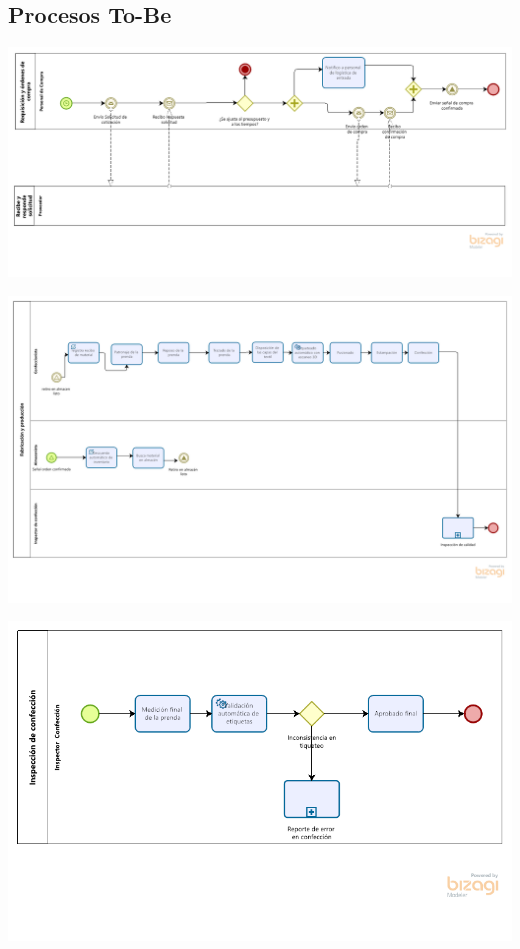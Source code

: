 \documentclass[11pt]{article}
\begin{document}
\subsection{Procesos To-Be}
\label{sec:orga70728b}

\begin{center}
\includegraphics[width=.9\linewidth]{./assets/build/to_be/requisicion_compra.png}
\end{center}

\begin{center}
\includegraphics[width=.9\linewidth]{./assets/build/to_be/fabricacion_produccion.png}
\end{center}

\begin{center}
\includegraphics[width=.9\linewidth]{./assets/build/to_be/inspeccion_confeccion.png}
\end{center}
\end{document}
